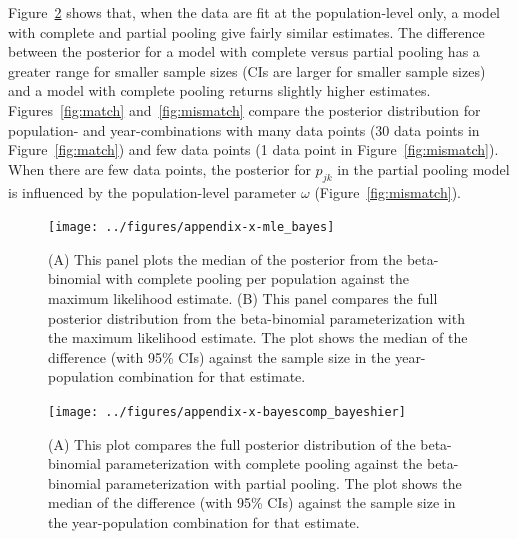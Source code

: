 \documentclass[12pt, oneside, titlepage]{article}   	%
\begin{document}
Figure~\ref{fig:complete_vs_partial} shows that, when the data are fit at the population-level only, a model with complete and partial pooling give fairly similar estimates. The difference between the posterior for a model with complete versus partial pooling has a greater range for smaller sample sizes (CIs are larger for smaller sample sizes) and a model with complete pooling returns slightly higher estimates. Figures~\ref{fig:match} and~\ref{fig:mismatch} compare the posterior distribution for population- and year-combinations with many data points (30 data points in Figure~\ref{fig:match}) and few data points (1 data point in Figure~\ref{fig:mismatch}). When there are few data points, the posterior for $p_{jk}$ in the partial pooling model is influenced by the population-level parameter $\omega$ (Figure~\ref{fig:mismatch}).




 \begin{figure}[h]
   \centering
       \texttt{[image: ../figures/appendix-x-mle\_bayes]}  
    \caption{ (A) This panel plots the median of the posterior from the beta-binomial with complete pooling per population against the maximum likelihood estimate. (B) This panel compares the full posterior distribution from the beta-binomial parameterization with the maximum likelihood estimate. The plot shows the median of the difference (with 95\% CIs) against the sample size in the year-population combination for that estimate.  }
 \label{fig:mle_bayes}
\end{figure}

 \begin{figure}[h]
   \centering
       \texttt{[image: ../figures/appendix-x-bayescomp\_bayeshier]}  
    \caption{ (A) This plot compares the full posterior distribution of the beta-binomial parameterization with complete pooling against the beta-binomial parameterization with partial pooling. The plot shows the median of the difference (with 95\% CIs) against the sample size in the year-population combination for that estimate.  }
 \label{fig:complete_vs_partial}
\end{figure}
\end{document}
